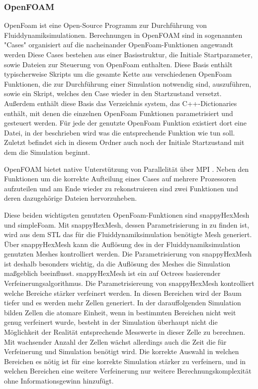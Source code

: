 \subsubsection{OpenFOAM}
\label{sub:openfoam}
OpenFoam \cite{OpenCFD.} ist eine Open-Source Programm zur Durchführung von Fluiddynamiksimulationen.
Berechnungen in OpenFOAM sind in sogenannten "Cases" organisiert auf die nacheinander OpenFoam-Funktionen angewandt werden
Diese Cases bestehen aus einer Basisstruktur, die Initiale Startparameter, sowie Dateien zur Steuerung von OpenFoam enthalten.
Diese Basis enthält typischerweise Skripts um die gesamte Kette aus verschiedenen OpenFoam Funktionen, die zur Durchführung einer Simulation notwendig sind, auszuführen, sowie ein Skript, welches den Case wieder in den Startzustand versetzt.
Außerdem enthält diese Basis das Verzeichnis system, das C++-Dictionaries enthält, mit denen die einzelnen OpenFoam Funktionen parametrisiert und gesteuert werden.
Für jede der genutzte OpenFoam Funktion existiert dort eine Datei, in der beschrieben wird was die entsprechende Funktion wie tun soll. 
Zuletzt befindet sich in diesem Ordner auch noch der Initiale Startzustand mit dem die Simulation beginnt.

OpenFOAM bietet native Unterstützung von Parallelität über MPI \cite{OpenMPI.}.
Neben den Funktionen um die korrekte Aufteilung eines Cases auf mehrere Prozessoren aufzuteilen und am Ende wieder zu rekonstruieren sind zwei Funktionen und deren dazugehörige Dateien hervorzuheben.

Diese beiden wichtigsten genutzten OpenFoam-Funktionen sind snappyHexMesh und simpleFoam.
Mit snappyHexMesh, dessen Parametrisierung in  zu finden ist, wird aus dem STL das für die Fluiddynamiksimulation benötigte Mesh generiert. Über snappyHexMesh kann die Auflösung des in der Fluiddynamiksimulation genutzten Meshes kontrolliert werden.
Die Parametrisierung von snappyHexMesh ist deshalb besonders wichtig, da die Auflösung des Meshes die Simulation maßgeblich beeinflusst.
snappyHexMesh ist ein auf Octrees \cite{Meagher.1982} basierender Verfeinerungsalgorithmus.
Die Parametrisiereung von snappyHexMesh kontrolliert welche Bereiche stärker verfeinert werden.
In diesen Bereichen wird der Baum tiefer und es werden mehr Zellen generiert.
In der darauffolgenden Simulation bilden Zellen die atomare Einheit, wenn in bestimmten Bereichen nicht weit genug verfeinert wurde, besteht in der Simulation überhaupt nicht die Möglichkeit der Realität entsprechende Messwerte in dieser Zelle zu berechnen.
Mit wachsender Anzahl der Zellen wächst allerdings auch die Zeit die für Verfeinerung und Simulation benötigt wird.
Die korrekte Auswahl in welchen Bereichen es nötig ist für eine korrekte Simulation stärker zu verfeinern, und in welchen Bereichen eine weitere Verfeinerung nur weitere Berechnungskomplexität ohne Informationsgewinn hinzufügt. 

